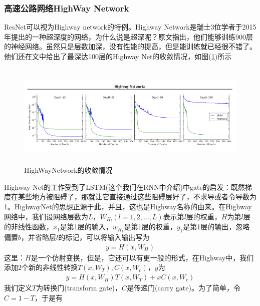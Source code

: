         \subsubsection{高速公路网络HighWay Network}
            \par
            ResNet可以视为Highway network的特例。Highway Network\cite{2015.Rupesh}是瑞士3位学者于2015年提出的一种超深度的网络，为什么说是超深呢？原文\cite{2015.Rupesh}指出，他们能够训练900层的神经网络。虽然只是层数加深，没有性能的提高，但是能训练就已经很不错了。他们还在文中给出了最深达100层的Highway Net的收敛情况，如图(\ref{fig:HighWayNetwork的收敛情况})所示
             \begin{figure}[H]
            \centering
            \includegraphics[height=5cm]{images/HighWayNetwork_convergence.jpg}
            \caption{HighWayNetwork的收敛情况}
            \label{fig:HighWayNetwork的收敛情况}
            \end{figure}
            \par
            Highway Net的工作受到了LSTM(这个我们在RNN中介绍)中gate的启发：既然梯度在某些地方被阻碍了，那就让它直接通过这些阻碍层好了，不求导或者令导数为1。HighwayNet的思想正源于此，并且，这也是Highway名称的由来。在Highway网络中，我们设网络层数为$L$，$W_{H_l}(l=1,2,\dots,L)$表示第$l$层的权重，$H$为第$l$层的非线性函数，$x_1$是第1层的输入，$w_{H_1}$是第1层的权重，$y_1$是第1层的输出，忽略偏置$b$，并省略层$l$的标记，可以将输入输出写为
            \begin{align*}
            y = H(x,W_H)
            \end{align*}
            这里：$H$是一个仿射变换，但是，它还可以有更一般的形式，在Highway中，我们添加2个新的非线性转换$T(x,W_T),C(x,W_c)$，$y$为
            \begin{align*}
            y = H(x,W_H)T(x,W_T)+xC(x,W_c)
            \end{align*}
            我们定义$T$为转换门(transform gate)，$C$是传递门(carry gate)。为了简单，令$C = 1-T$，于是有
